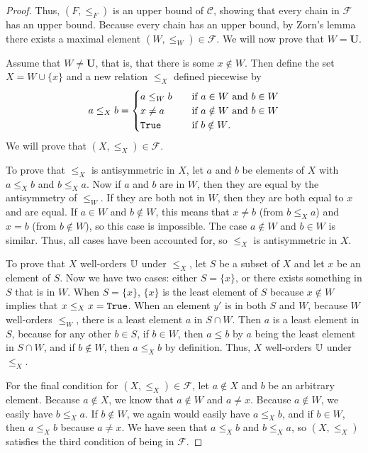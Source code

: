 \documentclass[../../math.tex]{subfiles}
\begin{document}
\begin{proof}
    Thus, $(F, \leq_F)$ is an upper bound of $\mathcal C$, showing that every
    chain in $\mathcal F$ has an upper bound.  Because every chain has an upper
    bound, by Zorn's lemma there exists a maximal element $(W, \leq_W) \in
    \mathcal F$.  We will now prove that $W = \bm U$.

    Assume that $W \neq \bm U$, that is, that there is some $x \notin W$.  Then
    define the set $X = W \cup \{x\}$ and a new relation $\leq_X$ defined
    piecewise by
    \[
        a \leq_X b =
        \begin{cases}
            a \leq_W b  & \quad \text{if $a \in W$ and $b \in W$} \\
            x \neq a    & \quad \text{if $a \notin W$ and $b \in W$} \\
            \verb|True| & \quad \text{if $b \notin W$.}
        \end{cases}
    \]
    We will prove that $(X, \leq_X) \in \mathcal F$.

    To prove that $\leq_X$ is antisymmetric in $X$, let $a$ and $b$ be elements
    of $X$ with $a \leq_X b$ and $b \leq_X a$.  Now if $a$ and $b$ are in $W$,
    then they are equal by the antisymmetry of $\leq_W$.  If they are both not
    in $W$, then they are both equal to $x$ and are equal.  If $a \in W$ and $b
    \notin W$, this means that $x \neq b$ (from $b \leq_X a$) and $x = b$ (from
    $b \notin W$), so this case is impossible.  The case $a \notin W$ and $b \in
    W$ is similar.  Thus, all cases have been accounted for, so $\leq_X$ is
    antisymmetric in $X$.

    To prove that $X$ well-orders $\mathbb{U}$ under $\leq_X$, let $S$ be a subset of
    $X$ and let $x$ be an element of $S$.  Now we have two cases: either $S =
    \{x\}$, or there exists something in $S$ that is in $W$.  When $S = \{x\}$,
    $\{x\}$ is the least element of $S$ because $x \notin W$ implies that $x
    \leq_X x = \verb|True|$.  When an element $y'$ is in both $S$ and $W$,
    because $W$ well-orders $\leq_W$, there is a least element $a$ in $S \cap
    W$.  Then $a$ is a least element in $S$, because for any other $b \in S$, if
    $b \in W$, then $a \leq b$ by $a$ being the least element in $S \cap W$, and
    if $b \notin W$, then $a \leq_X b$ by definition.  Thus, $X$ well-orders
    $\mathbb{U}$ under $\leq_X$.

    For the final condition for $(X, \leq_X) \in \mathcal F$, let $a \notin X$
    and $b$ be an arbitrary element.  Because $a \notin X$, we know that $a
    \notin W$ and $a \neq x$.  Because $a \notin W$, we easily have $b \leq_X
    a$.  If $b \notin W$, we again would easily have $a \leq_X b$, and if $b \in
    W$, then $a \leq_X b$ because $a \neq x$.  We have seen that $a \leq_X b$
    and $b \leq_X a$, so $(X, \leq_X)$ satisfies the third condition of being in
    $\mathcal F$.


\end{proof}
\end{document}
